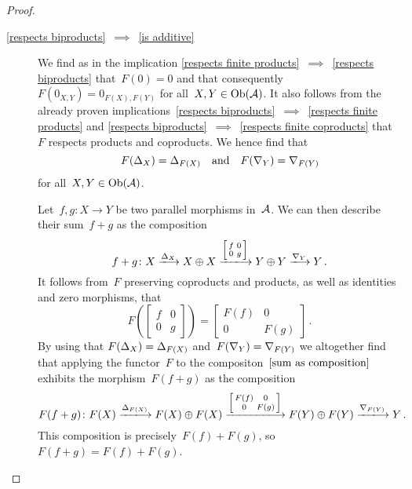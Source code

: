 \begin{proof}
\begin{enumerate}
\begin{description}
        \item[\ref*{respects biproducts}~$\implies$~\ref*{is additive}]
          We find as in the implication \ref*{respects finite products}~$\implies$~\ref*{respects biproducts} that~$F(0) = 0$ and that consequently~$F(0_{X,Y}) =  0_{F(X), F(Y)}$ for all~$X, Y \in \operatorname{Ob}(\mathcal{A})$.
          It also follows from the already proven implications~\ref*{respects biproducts}~$\implies$~\ref*{respects finite products} and \ref*{respects biproducts}~$\implies$~\ref*{respects finite coproducts} that~$F$ respects products and coproducts.
          We hence find that
          \[
              F(\Delta_X)
            = \Delta_{F(X)}
            \quad\text{and}\quad
              F(\nabla_Y)
            = \nabla_{F(Y)}
          \]
          for all~$X, Y \in \operatorname{Ob}(\mathcal{A})$.
          
          Let~$f, g \colon X \to Y$ be two parallel morphisms in~$\mathcal{A}$.
          We can then describe their sum~$f+g$ as the composition
          \begin{equation}
            \label{sum as composition}
              f+g
            \colon
              X
            \xlongto{\diag_X}
              X \oplus X
            \xlongto{\begin{bsmallmatrix} f & 0 \\ 0 & g \end{bsmallmatrix}}
              Y \oplus Y
            \xlongto{\codiag_Y}
              Y \,.
          \end{equation}
          It follows from~$F$ preserving coproducts and products, as well as identities and zero morphisms, that
          \[
            F
            \left(
              \begin{bmatrix}
                f & 0 \\
                0 & g
              \end{bmatrix}
            \right)
            =
            \begin{bmatrix}
              F(f)  & 0     \\
              0     & F(g)
            \end{bmatrix} \,.
          \]
          By using that $F(\Delta_X) = \Delta_{F(X)}$ and~$F(\nabla_Y) = \nabla_{F(Y)}$ we altogether find that applying the functor~$F$ to the compositon~$\eqref{sum as composition}$ exhibits the morphism~$F(f+g)$ as the composition
          \[
              F(f+g)
            \colon
              F(X)
            \xlongto{\diag_{F(X)}}
              F(X) \oplus F(X)
            \xlongto{\begin{bsmallmatrix} F(f) & 0 \\ 0 & F(g) \end{bsmallmatrix}}
              F(Y) \oplus F(Y)
            \xlongto{\codiag_{F(Y)}}
              Y \,.
          \]
          This composition is precisely~$F(f) + F(g)$, so~$F(f + g) = F(f) + F(g)$.
        \qedhere
      \end{description}
  \end{enumerate}
\end{proof}





